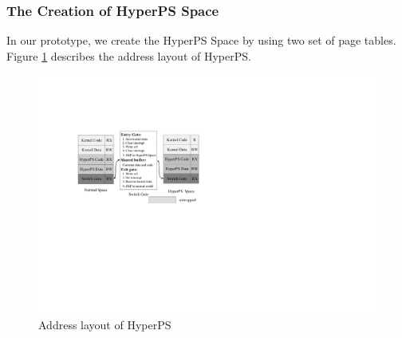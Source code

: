 \subsubsection{The Creation of HyperPS Space}%
\label{ssub:hyperps_space_creation}

In our prototype, we create the HyperPS Space by using two set of page tables.  
Figure \ref{fig:address} describes the address layout of HyperPS. 
\begin{figure}[htpb]
    \centering
    \includegraphics[width=0.8\linewidth]{IMG/address.pdf}
    \caption{Address layout of HyperPS}%
    \label{fig:address}
\end{figure}


